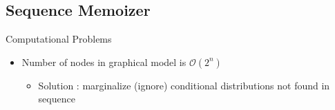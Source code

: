 \subsection{Sequence Memoizer}



 \begin{frame}[t]{Computational Problems}
\begin{itemize}
\item Number of nodes in graphical model is $\mathcal{O}(2^n)$
\begin{itemize}
\item Solution : marginalize (ignore) conditional distributions not found in sequence
\end{itemize}
\end{itemize}
\end{frame}
  
 
 

